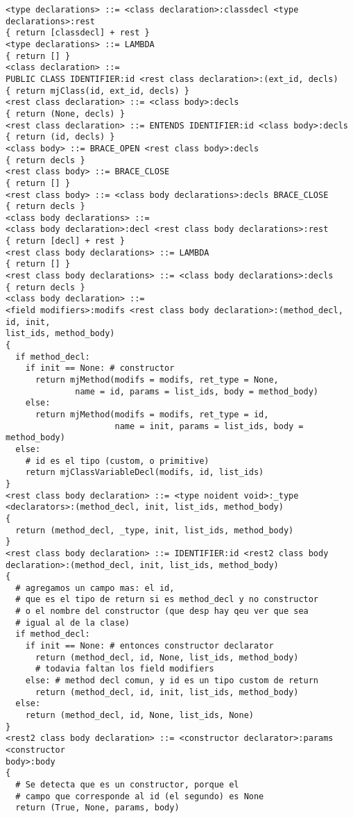 \documentclass [a4paper,abstracton,titlepage]{scrartcl}
\begin{document}
    \begin{lstlisting}
<type declarations> ::= <class declaration>:classdecl <type declarations>:rest
{ return [classdecl] + rest }
<type declarations> ::= LAMBDA
{ return [] }
<class declaration> ::= 
PUBLIC CLASS IDENTIFIER:id <rest class declaration>:(ext_id, decls)
{ return mjClass(id, ext_id, decls) }
<rest class declaration> ::= <class body>:decls
{ return (None, decls) }
<rest class declaration> ::= ENTENDS IDENTIFIER:id <class body>:decls
{ return (id, decls) }
<class body> ::= BRACE_OPEN <rest class body>:decls
{ return decls }
<rest class body> ::= BRACE_CLOSE
{ return [] }
<rest class body> ::= <class body declarations>:decls BRACE_CLOSE
{ return decls }
<class body declarations> ::= 
<class body declaration>:decl <rest class body declarations>:rest
{ return [decl] + rest }
<rest class body declarations> ::= LAMBDA
{ return [] }
<rest class body declarations> ::= <class body declarations>:decls
{ return decls }
<class body declaration> ::= 
<field modifiers>:modifs <rest class body declaration>:(method_decl, id, init,
list_ids, method_body)
{
  if method_decl:
    if init == None: # constructor
      return mjMethod(modifs = modifs, ret_type = None,
		      name = id, params = list_ids, body = method_body)
    else:
      return mjMethod(modifs = modifs, ret_type = id,
                      name = init, params = list_ids, body = method_body)
  else:
    # id es el tipo (custom, o primitive)
    return mjClassVariableDecl(modifs, id, list_ids)
}
<rest class body declaration> ::= <type noident void>:_type
<declarators>:(method_decl, init, list_ids, method_body)
{
  return (method_decl, _type, init, list_ids, method_body)
}
<rest class body declaration> ::= IDENTIFIER:id <rest2 class body
declaration>:(method_decl, init, list_ids, method_body)
{
  # agregamos un campo mas: el id, 
  # que es el tipo de return si es method_decl y no constructor
  # o el nombre del constructor (que desp hay qeu ver que sea 
  # igual al de la clase)
  if method_decl:
    if init == None: # entonces constructor declarator
      return (method_decl, id, None, list_ids, method_body) 
      # todavia faltan los field modifiers
    else: # method decl comun, y id es un tipo custom de return
      return (method_decl, id, init, list_ids, method_body)
  else:
    return (method_decl, id, None, list_ids, None)
}
<rest2 class body declaration> ::= <constructor declarator>:params <constructor
body>:body
{
  # Se detecta que es un constructor, porque el 
  # campo que corresponde al id (el segundo) es None
  return (True, None, params, body)

\end{lstlisting}
\end{document}
